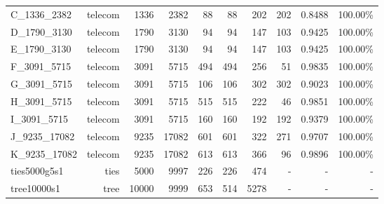 \begin{longtable}{lrrrrrrrrr}
C\_1336\_2382 & telecom & 1336 & 2382 & 88 & 88 & 202 & 202 & 0.8488 & 100.00\% \\
D\_1790\_3130 & telecom & 1790 & 3130 & 94 & 94 & 147 & 103 & 0.9425 & 100.00\% \\
E\_1790\_3130 & telecom & 1790 & 3130 & 94 & 94 & 147 & 103 & 0.9425 & 100.00\% \\
F\_3091\_5715 & telecom & 3091 & 5715 & 494 & 494 & 256 & 51 & 0.9835 & 100.00\% \\
G\_3091\_5715 & telecom & 3091 & 5715 & 106 & 106 & 302 & 302 & 0.9023 & 100.00\% \\
H\_3091\_5715 & telecom & 3091 & 5715 & 515 & 515 & 222 & 46 & 0.9851 & 100.00\% \\
I\_3091\_5715 & telecom & 3091 & 5715 & 160 & 160 & 192 & 192 & 0.9379 & 100.00\% \\
J\_9235\_17082 & telecom & 9235 & 17082 & 601 & 601 & 322 & 271 & 0.9707 & 100.00\% \\
K\_9235\_17082 & telecom & 9235 & 17082 & 613 & 613 & 366 & 96 & 0.9896 & 100.00\% \\
ties5000g5s1 & ties & 5000 & 9997 & 226 & 226 & 474 & - & - & - \\
tree10000s1 & tree & 10000 & 9999 & 653 & 514 & 5278 & - & - & - \\
\end{longtable}
